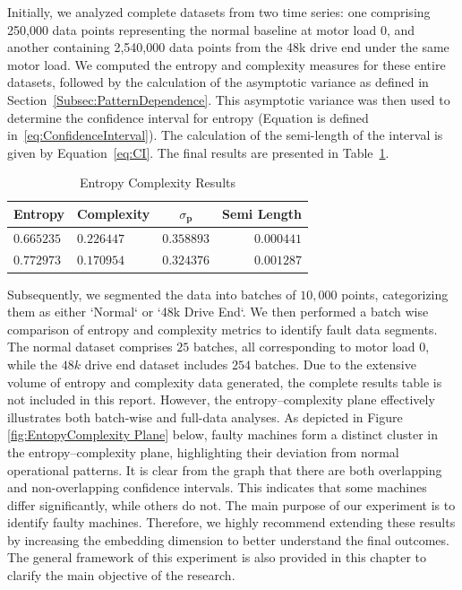 Initially, we analyzed complete datasets from two time series: one comprising 250,000 data points representing the normal baseline at motor load 0, and another containing 2,540,000 data points from the 48k drive end under the same motor load. We computed the entropy and complexity measures for these entire datasets, followed by the calculation of the asymptotic variance as defined in Section~\ref{Subsec:PatternDependence}. This asymptotic variance was then used to determine the confidence interval for entropy (Equation is defined in~\ref{eq:ConfidenceInterval}). The calculation of the semi-length of the interval is given by Equation~\ref{eq:CI}. 
The final results are presented in Table~\ref{tab:EnComplexResults}.

\begin{table}[H]
	\centering
	\begin{tabular}{llcr}
		\toprule
		Entropy  & Complexity  & $\sigma_{\bm{p}}$ & Semi Length \\
		\midrule
		$0.665235$ & $0.226447$ & $0.358893$ & $0.000441$\\ 
		$0.772973$ & $0.170954$ & $0.324376$ & $0.001287$\\
		\bottomrule
	\end{tabular}
	\caption{Entropy Complexity Results}
	\label{tab:EnComplexResults}
\end{table}

Subsequently, we segmented the data into batches of $10,000$ points, categorizing them as either `Normal` or `48k Drive End`. We then performed a batch wise comparison of entropy and complexity metrics to identify fault data segments. 
The normal dataset comprises $25$ batches, all corresponding to motor load $0$, while the $48k$ drive end dataset includes $254$ batches. Due to the extensive volume of entropy and complexity data generated, the complete results table is not included in this report. However, the entropy–complexity plane effectively illustrates both batch-wise and full-data analyses. As depicted in Figure \ref{fig:EntopyComplexity Plane} below, faulty machines form a distinct cluster in the entropy–complexity plane, highlighting their deviation from normal operational patterns. 
It is clear from the graph that there are both overlapping and non-overlapping confidence intervals. This indicates that some machines differ significantly, while others do not. The main purpose of our experiment is to identify faulty machines. Therefore, we highly recommend extending these results by increasing the embedding dimension to better understand the final outcomes. The general framework of this experiment is also provided in this chapter to clarify the main objective of the research.

